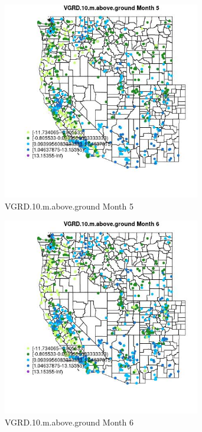 \begin{figure} 
\centering  
\includegraphics[width=0.77\textwidth]{Code_Outputs/Report_ML_input_PM25_Step4_part_f_de_duplicated_aveswNAs_MapObsMo5VGRD10maboveground.jpg} 
\caption{\label{fig:Report_ML_input_PM25_Step4_part_f_de_duplicated_aveswNAsMapObsMo5VGRD10maboveground}VGRD.10.m.above.ground Month 5} 
\end{figure} 
 

\begin{figure} 
\centering  
\includegraphics[width=0.77\textwidth]{Code_Outputs/Report_ML_input_PM25_Step4_part_f_de_duplicated_aveswNAs_MapObsMo6VGRD10maboveground.jpg} 
\caption{\label{fig:Report_ML_input_PM25_Step4_part_f_de_duplicated_aveswNAsMapObsMo6VGRD10maboveground}VGRD.10.m.above.ground Month 6} 
\end{figure} 
 

